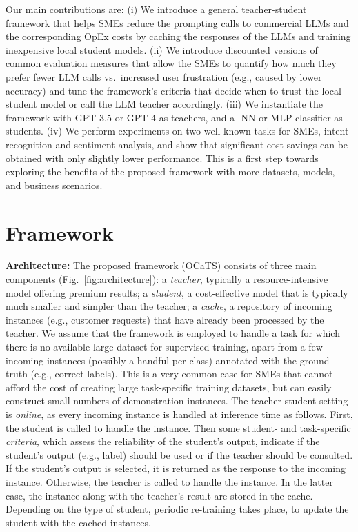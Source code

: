 \documentclass[11pt]{article}
\begin{document}
Our main contributions are: (i) We introduce a general teacher-student framework that helps SMEs reduce the prompting calls to commercial LLMs and the corresponding OpEx costs by caching the responses of the LLMs and training inexpensive local student models. (ii) We introduce discounted versions of common evaluation measures that allow the SMEs to quantify how much they prefer fewer LLM calls vs.\ increased user frustration (e.g., caused by lower accuracy) and tune the framework's criteria that decide when to trust the local student model or call the LLM teacher accordingly. (iii) We instantiate the framework with GPT-3.5 or GPT-4 as teachers, and a -NN or MLP classifier as students. (iv) We perform experiments on two well-known tasks for SMEs, intent recognition and sentiment analysis, and show that significant cost savings can be obtained with only slightly lower performance. This is a first step towards exploring the benefits of the proposed framework with more datasets, models, and business scenarios.

\section{Framework} \label{sec:framework}

\noindent\textbf{Architecture:} The proposed framework (OCaTS) consists of three main components (Fig.~\ref{fig:architecture}): a \emph{teacher}, typically a resource-intensive model offering premium results; a \emph{student}, a cost-effective model that is typically much smaller and simpler than the teacher; a \emph{cache}, a repository of incoming instances (e.g., customer requests) that have already been processed by the teacher. We assume that the framework is employed to handle a task for which there is no available large dataset for supervised training, apart from a few incoming instances (possibly a handful per class) annotated with the ground truth (e.g., correct labels). This is a very common case for SMEs that cannot afford the cost of creating large task-specific training datasets, but can easily construct small numbers of demonstration instances. The teacher-student setting is \emph{online}, as every incoming instance is handled at inference time as follows. First, the student is called to handle the instance. Then some student- and task-specific \emph{criteria}, which assess the reliability of the student's output, indicate if the student's output (e.g., label) should be used or if the teacher should be consulted. If the student's output is selected, it is returned as the response to the incoming instance. Otherwise, the teacher is called to handle the instance. In the latter case, the instance along with the teacher's result are stored in the cache. Depending on the type of student, periodic re-training takes place, to update the student with the cached instances.
\end{document}
